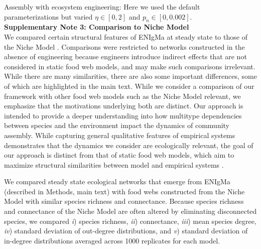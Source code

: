 \documentclass[onecolumn,preprintnumbers,amsmath,amssymb,superscriptaddress]{revtex4-1}
\begin{document}
\begin{bibunit}
Assembly with ecosystem engineering: Here we used the default parameterizations but varied $\eta \in [0,2]$ and $p_n \in [0,0.002]$.\\


\noindent \textbf{Supplementary Note 3: Comparison to Niche Model}\\
We compared certain structural features of ENIgMa at steady state to those of the Niche Model \cite{Williams2000}.
Comparisons were restricted to networks constructed in the absence of engineering because engineers introduce indirect effects that are not considered in static food web models, and may make such comparisons irrelevant.
While there are many similarities, there are also some important differences, some of which are highlighted in the main text.
While we consider a comparison of our framework with other food web models such as the Niche Model relevant, we emphasize that the motivations underlying both are distinct.
Our approach is intended to provide a deeper understanding into how multitype dependencies between species and the environment impact the dynamics of community assembly.
While capturing general qualitative features of empirical systems demonstrates that the dynamics we consider are ecologically relevant, the goal of our approach is distinct from that of static food web models, which aim to maximize structural similarities between model and empirical systems \cite{Williams2000,Williams2011}.

We compared steady state ecological networks that emerge from ENIgMa (described in Methods, main text) with food webs constructed from the Niche Model \cite{Williams2000} with similar species richness and connectance.
Because species richness and connectance of the Niche Model are often altered by eliminating disconnected species, we compared
\emph{i}) species richness,
\emph{ii}) connectance,
\emph{iii}) mean species degree,
\emph{iv}) standard deviation of out-degree distributions, and
\emph{v}) standard deviation of in-degree distributions
averaged across 1000 replicates for each model.


\end{bibunit}
\end{document}

